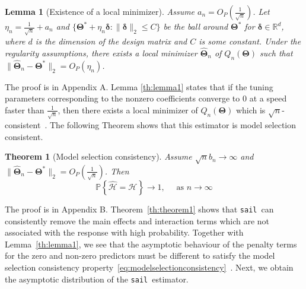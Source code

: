 \documentclass[12pt,letter]{article}\usepackage[]{graphicx}\usepackage[]{color}
\newtheorem{theorem}{Theorem}
\newtheorem{lemma}{Lemma}
\newcommand{\sail}{\texttt{sail}}
\newcommand{\bD}{\textbf{\text{D}}}
\newcommand{\bTheta}{\boldsymbol{\Theta}}
\newcommand{\btau}{\boldsymbol{\tau}}
\newcommand{\btheta}{\boldsymbol{\theta}}
\newcommand{\bPsi}{\boldsymbol{\Psi}}
\DeclareMathOperator*{\argmin}{arg\,min}
\begin{document}




\begin{lemma}[Existence of a local minimizer]\label{th:lemma1}
	Assume $a_n = O_P(\frac{1}{\sqrt{n}})$. Let $\eta_{n}=\frac{1}{\sqrt{n}}+a_{n}$ and $\{\bTheta^{*}+\eta_{n}\boldsymbol{\delta}:\|\boldsymbol{\delta}\|_2\leq C\}$
	be the ball around $\bTheta^{*}$ for $\boldsymbol{\delta} \in \mathbb{R}^d$, where $d$ is the dimension of the design matrix and $C$ is some constant. Under the regularity assumptions, there exists a local minimizer $\widehat{\bTheta}_n$ of $Q_n(\bTheta)$ such that $\|\widehat{\bTheta}_n - \bTheta^*  \|_2 = O_P(\eta_{n})$.
\end{lemma}

The proof is in Appendix A. Lemma \eqref{th:lemma1} states that if the tuning parameters corresponding to the nonzero coefficients converge to 0 at a speed faster than $\frac{1}{\sqrt{n}}$, then there exists a local minimizer of $Q_n(\bTheta)$ which is $\sqrt{n}$-consistent~\citep{wang2007regression, choi2010variable}. The following Theorem shows that this estimator is model selection consistent.



\begin{theorem}[Model selection consistency] \label{th:theorem1}
	Assume $\sqrt{n}b_n \to \infty$ and $\|\widehat{\bTheta}_n - \bTheta^*  \|_2 = O_P(\frac{1}{\sqrt{n}})$. Then \begin{equation}
	\mathbb{P}\left\{\widehat{\mathcal{H}}=\mathcal{H}\right\} \rightarrow 1, \quad \text { as } n \rightarrow \infty \label{eq:modelselectionconsistency}
	\end{equation}
\end{theorem}

The proof is in Appendix B. Theorem~\eqref{th:theorem1} shows that \sail ~can consistently remove the main effects and interaction terms which are not associated with the response with high probability. Together with Lemma~\eqref{th:lemma1}, we see that the asymptotic behaviour of the penalty terms for the zero and non-zero predictors must be different to satisfy the model selection consistency property~\eqref{eq:modelselectionconsistency}~\citep{nardi2008asymptotic}. Next, we obtain the asymptotic distribution of the \sail ~estimator.
\end{document}
